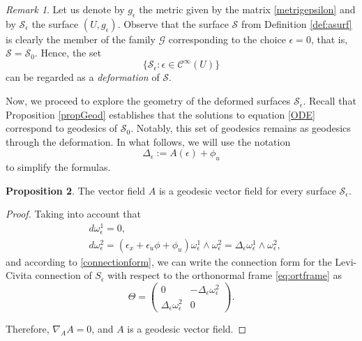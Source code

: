 \documentclass{article}
\theoremstyle{remark}
\newtheorem{remark}{Remark}[section]
\theoremstyle{definition}
\newtheorem{proposition}[remark]{Proposition}
\begin{document}
\begin{remark}
    Let us denote by $g_{\epsilon}$ the metric given by the matrix \eqref{metrigepsilon} and by $\mathcal{S}_{\epsilon}$ the surface $(U, g_{\epsilon})$. Observe that the surface $\mathcal{S}$ from Definition \ref{def:asurf} is clearly the member of the family $\mathcal{G}$ corresponding to the choice $\epsilon = 0$, that is, $\mathcal{S} = \mathcal{S}_0$. Hence, the set  
    $$
    \{\mathcal{S}_{\epsilon} : \epsilon \in \mathcal{C}^{\infty}(U)\}
    $$  
    can be regarded as a \emph{deformation} of $\mathcal{S}$.  
\end{remark}
    


Now, we proceed to explore the geometry of the deformed surfaces $\mathcal{S}_{\epsilon}$. Recall that Proposition \ref{propGeod} establishes that the solutions to equation \eqref{ODE} correspond to geodesics of $\mathcal{S}_0$. Notably, this set of geodesics remains as geodesics through the deformation. In what follows, we will use the notation
\begin{equation}\label{deltaeps}
    \Delta_{\epsilon}:=A(\epsilon)+\phi_u
\end{equation}
to simplify the formulas.


\begin{proposition}\label{geodesicDef}
The vector field $A$ is a geodesic vector field for every surface $\mathcal{S}_{\epsilon}$.
\end{proposition}
\begin{proof}
Taking into account that 
\begin{align*}
& d\omega_{\epsilon}^1=0,
\\
& d\omega_{\epsilon}^2=(\epsilon_x+\epsilon_u \phi+ \phi_u) \omega_{\epsilon}^1 \wedge \omega_{\epsilon}^2=\Delta_{\epsilon} \omega_{\epsilon}^1 \wedge \omega_{\epsilon}^2,
\end{align*}
and according to \eqref{connectionform}, we can write the connection form for the Levi-Civita connection of $S_{\epsilon}$ with respect to the orthonormal frame \eqref{eq:ortframe} as
\begin{equation}\label{LCdef}
\Theta=\begin{pmatrix}
    0 & -\Delta_{\epsilon} \omega_{\epsilon}^2\\ 
    \Delta_{\epsilon} \omega_{\epsilon}^2 & 0
\end{pmatrix}.    
\end{equation}

Therefore, $\nabla_{A} A=0$, and $A$ is a geodesic vector field.
\end{proof}
\end{document}
